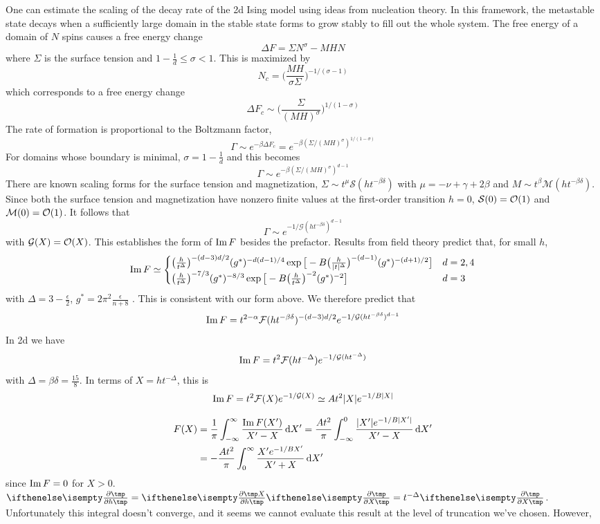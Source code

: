 \documentclass[fleqn]{article}
\begin{document}
One can estimate the scaling of the decay rate of the {\sc 2d} Ising model
using ideas from nucleation theory. In this framework, the metastable state
decays when a sufficiently large domain in the stable state forms to grow
stably to fill out the whole system. The free energy of a domain of $N$ spins
causes a free energy change
\[
  \Delta F=\Sigma N^\sigma-MHN
\]
where $\Sigma$ is the surface tension and $1-\frac1d\leq\sigma<1$. This is
maximized by
\[
  N_c=\bigg(\frac{MH}{\sigma\Sigma}\bigg)^{-1/(\sigma-1)}
\]
which corresponds to a free energy change
\[
  \Delta F_c\sim\bigg(\frac\Sigma{(MH)^\sigma}\bigg)^{1/(1-\sigma)}
\]
The rate of formation is proportional to the Boltzmann factor,
\[
  \Gamma\sim e^{-\beta \Delta
  F_c}=e^{-\beta(\Sigma/(MH)^\sigma)^{1/(1-\sigma)}}
\]
For domains whose boundary is minimal, $\sigma=1-\frac1d$ and this becomes
\[
  \Gamma\sim e^{-\beta(\Sigma/(MH)^\sigma)^{d-1}}
\]
There are known scaling forms for the surface tension and magnetization, $\Sigma\sim t^\mu\mathcal S(ht^{-\beta\delta})$ with $\mu=-\nu+\gamma+2\beta$
\cite{widom.1981.interface} and $M\sim t^\beta\mathcal M(ht^{-\beta\delta})$.
Since both the surface tension and magnetization have nonzero finite values at
the first-order transition $h=0$, $\mathcal S(0)=\mathcal O(1)$ and $\mathcal
M(0)=\mathcal O(1)$. It follows that
\[
  \Gamma\sim e^{-1/\mathcal G(ht^{-\beta\delta})^{d-1}}
\]
with $\mathcal G(X)=\mathcal O(X)$. This establishes the form of $\mathop{\mathrm{Im}}\nolimits F$
besides the prefactor. Results from field theory predict that, for small $h$,
\[
  \mathop{\mathrm{Im}}\nolimits F\simeq
  \begin{cases}
    \big(\frac
    h{t^\Delta}\big)^{-(d-3)d/2}(g^*)^{-d(d-1)/4}\exp\big[-B\big(\frac
    h{|t|^\Delta}\big)^{-(d-1)}(g^*)^{-(d+1)/2}\big] & d=2,4\\
    \big(\frac
    h{t^\Delta}\big)^{-7/3}(g^*)^{-8/3}\exp\big[-B\big(\frac
    h{t^\Delta}\big)^{-2}(g^*)^{-2}\big]
    & d=3
  \end{cases}
\]
with $\Delta=3-\frac\epsilon2$, $g^*=2\pi^2\frac\epsilon{n+8}$
\cite{houghton.1980.metastable,gunther.1980.goldstone}. This is consistent
with our form above. We therefore predict that
\[
  \mathop{\mathrm{Im}}\nolimits F=t^{2-\alpha}\mathcal F(ht^{-\beta\delta})^{-(d-3)d/2}e^{-1/\mathcal
    G(ht^{-\beta\delta})^{d-1}}
\]
In {\sc 2d} we have
\[
  \mathop{\mathrm{Im}}\nolimits F=t^2\mathcal F(ht^{-\Delta})e^{-1/\mathcal G(ht^{-\Delta})}
\]
with $\Delta=\beta\delta=\frac{15}8$. In terms of $X=ht^{-\Delta}$, this is
\[
  \mathop{\mathrm{Im}}\nolimits F=t^2\mathcal F(X)e^{-1/\mathcal G(X)}\simeq At^2|X|e^{-1/B|X|}
\]

\begin{align}
  F(X)
  &=\frac1\pi\int_{-\infty}^\infty\frac{\mathop{\mathrm{Im}}\nolimits F(X')}{X'-X}\,\mathrm d X'
  =\frac{At^2}\pi\int_{-\infty}^0\frac{|X'|e^{-1/B|X'|}}{X'-X}\,\mathrm d X'\\
  &=-\frac{At^2}\pi\int_0^\infty\frac{X'e^{-1/BX'}}{X'+X}\,\mathrm d X'
\end{align}
since $\mathop{\mathrm{Im}}\nolimits F=0$ for $X>0$. $\pd{}h=\pd Xh\pd{}X=t^{-\Delta}\pd{}X$.
Unfortunately this integral doesn't converge, and it seems we cannot evaluate
this result at the level of truncation we've chosen. However, 
\end{document}
